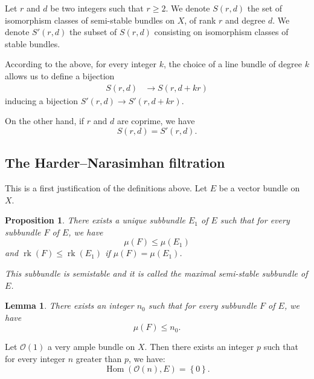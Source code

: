 \documentclass[12pt,a4paper]{book}
\DeclareMathOperator\rk{rk}
\DeclareMathOperator\Hom{Hom}
\def\OO{\mathscr{O}}
\newtheorem{prop}[thm]{Proposition}
\newtheorem{lemma}[thm]{Lemma}
\theoremstyle{definition} \newtheorem{defn}[thm]{Definition}
\theoremstyle{definition} \newtheorem{ejs}[thm]{Examples}
\theoremstyle{definition} \newtheorem{ej}[thm]{Example}
\begin{document}
    Let $r$ and $d$ be two integers such that $r\geq 2$. We denote $S(r,d)$ the set of isomorphism classes of semi-stable bundles on $X$, of rank $r$ and degree $d$. We denote $S'(r,d)$ the subset of $S(r,d)$ consisting on isomorphism classes of stable bundles.

    According to the above, for every integer $k$, the choice of a line bundle of degree $k$ allows us to define a bijection
    \begin{align*}
       S(r,d) &\longrightarrow S(r,d+kr)
      \end{align*}
      inducing a bijection $S'(r,d) \rightarrow S'(r,d+kr)$.

      On the other hand, if $r$ and $d$ are coprime, we have
      \begin{equation*}
	S(r,d)=S'(r,d).
      \end{equation*}

      \subsection{The Harder--Narasimhan filtration}
      This is a first justification of the definitions above. Let $E$ be a vector bundle on $X$.

      \begin{prop}\label{1.2}
	There exists a unique subbundle $E_1$ of $E$ such that for every subbundle $F$ of $E$, we have
	\begin{equation*}
	  \mu(F) \leq \mu(E_1)
	\end{equation*}
	and $\rk(F) \leq \rk(E_1)$ if $\mu(F)=\mu(E_1)$.

	This subbundle is semistable and it is called the \emph{maximal semi-stable subbundle of $E$}.
      \end{prop}

      \begin{lemma}\label{1.3}
	There exists an integer $n_0$ such that for every subbundle $F$ of $E$, we have
	\begin{equation*}
	  \mu(F) \leq n_0.
	\end{equation*}
      \end{lemma}

      Let $\OO(1)$ a very ample bundle on $X$. Then there exists an integer $p$ such that for every integer $n$ greater than $p$, we have:
      \begin{equation*}
	\Hom(\OO(n),E)=\left\{ 0 \right\}.
      \end{equation*}
\end{document}
